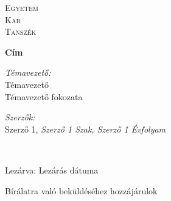%
%
%

\begin{titlepage}

\center

\textsc{\LARGE {{Egyetem}}}\\[1.5cm]
\textsc{\Large {{Kar}}}
\\[0.5cm]

\textsc{\large {{Tanszék}}}
\\[2.5cm]

{\huge \bfseries {{Cím}} \par}

\ifdefined\printName
  \vspace*{6.5cm}

  \begin{minipage}{.4\linewidth}
    \begin{flushleft}
      \large \textit{Témavezető:} \\
      {{Témavezető}} \\
      {{Témavezető fokozata}}
    \end{flushleft}
  \end{minipage}
  \hfill
  \begin{minipage}{.52\linewidth} 
    \begin{flushright}
      \large \textit{{Szerzők}:}\\
      {{Szerző 1}}, \textit{{{Szerző 1 Szak}}, {{Szerző 1 Évfolyam}}}
    \end{flushright}
  \end{minipage}
  \\[2.5cm]
\else
  \vspace*{10.5cm}
\fi

{\large Lezárva: {{Lezárás dátuma}}}\\ 

\ifdefined\printName
  \ifx\otdk\undefined
    \begin{flushleft}
      Bírálatra való beküldéséhez hozzájárulok
    \end{flushleft}
  \fi
\fi

\vfill

\end{titlepage}
